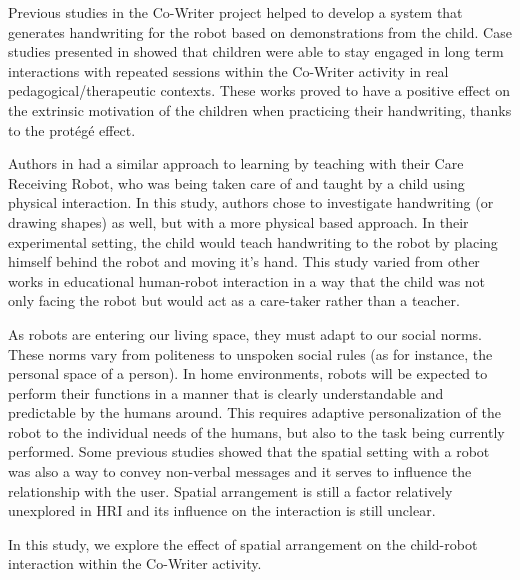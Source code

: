 \documentclass[letterpaper, 10 pt, conference]{ieeeconf}  %
\begin{document}
Previous studies in the Co-Writer project helped to develop a system that generates handwriting for the robot based on demonstrations from the child\cite{hood2015when}.
Case studies presented in \cite{jacq2016building} showed that children were able to stay engaged in long term interactions with repeated sessions within the Co-Writer activity in real pedagogical/therapeutic contexts.
These works proved to have a positive effect on the extrinsic motivation of the children when practicing their handwriting, thanks to the protégé effect.

Authors in \cite{Matsuzoe2012} had a similar approach to learning by teaching with their Care Receiving Robot, who was being taken care of and taught by a child using physical interaction. 
In this study, authors chose to investigate handwriting (or drawing shapes) as well, but with a more physical based approach.
In their experimental setting, the child would teach handwriting to the robot by placing himself behind the robot and moving it's hand.
This study varied from other works in educational human-robot interaction in a way that the child was not only facing the robot but would act as a care-taker rather than a teacher.

As robots are entering our living space, they must adapt to our social norms.
These norms vary from politeness to unspoken social rules (as for instance, the personal space of a person).
In home environments, robots will be expected to perform their functions in a manner that is clearly understandable and predictable by the humans around.
This requires adaptive personalization of the robot to the individual needs of the humans, but also to the task being currently performed.
Some previous studies showed that the spatial setting with a robot was also a way to convey non-verbal messages and it serves to influence the relationship with the user\cite{Takayama2009,kristoffersson2013measuring}. 
Spatial arrangement is still a factor relatively unexplored in HRI and its influence on the interaction is still unclear. 

In this study, we explore the effect of spatial arrangement on the child-robot interaction within the Co-Writer activity.
\end{document}

